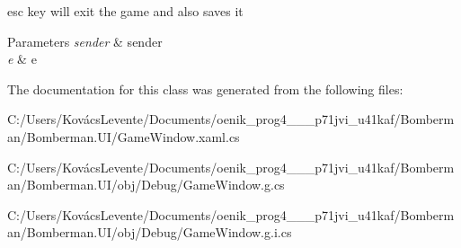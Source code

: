 esc key will exit the game and also saves it 


\begin{DoxyParams}{Parameters}
{\em sender} & sender\\
\hline
{\em e} & e\\
\hline
\end{DoxyParams}


The documentation for this class was generated from the following files\+:\begin{DoxyCompactItemize}
\item 
C\+:/\+Users/\+Kovács\+Levente/\+Documents/oenik\+\_\+prog4\+\_\+\_\+\_\+p71jvi\+\_\+u41kaf/\+Bomberman/\+Bomberman.\+U\+I/Game\+Window.\+xaml.\+cs\item 
C\+:/\+Users/\+Kovács\+Levente/\+Documents/oenik\+\_\+prog4\+\_\+\_\+\_\+p71jvi\+\_\+u41kaf/\+Bomberman/\+Bomberman.\+U\+I/obj/\+Debug/Game\+Window.\+g.\+cs\item 
C\+:/\+Users/\+Kovács\+Levente/\+Documents/oenik\+\_\+prog4\+\_\+\_\+\_\+p71jvi\+\_\+u41kaf/\+Bomberman/\+Bomberman.\+U\+I/obj/\+Debug/Game\+Window.\+g.\+i.\+cs\end{DoxyCompactItemize}
